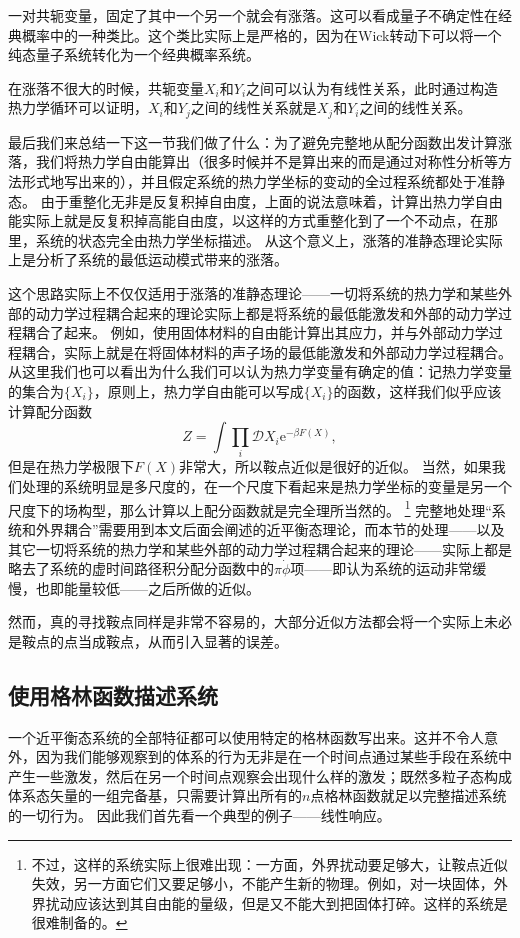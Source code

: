 \documentclass[hyperref, UTF8, a4paper]{ctexart}
\newcommand*{\ee}{\mathrm{e}}
\newcommand*{\fd}[1]{\mathcal{D}{#1}}
\begin{document}
一对共轭变量，固定了其中一个另一个就会有涨落。这可以看成量子不确定性在经典概率中的一种类比。这个类比实际上是严格的，因为在Wick转动下可以将一个纯态量子系统转化为一个经典概率系统。

在涨落不很大的时候，共轭变量$X_i$和$Y_i$之间可以认为有线性关系，此时通过构造热力学循环可以证明，$X_i$和$Y_j$之间的线性关系就是$X_j$和$Y_i$之间的线性关系。

最后我们来总结一下这一节我们做了什么：为了避免完整地从配分函数出发计算涨落，我们将热力学自由能算出（很多时候并不是算出来的而是通过对称性分析等方法形式地写出来的），并且假定系统的热力学坐标的变动的全过程系统都处于准静态。
由于重整化无非是反复积掉自由度，上面的说法意味着，计算出热力学自由能实际上就是反复积掉高能自由度，以这样的方式重整化到了一个不动点，在那里，系统的状态完全由热力学坐标描述。
从这个意义上，涨落的准静态理论实际上是分析了系统的最低运动模式带来的涨落。

这个思路实际上不仅仅适用于涨落的准静态理论——一切将系统的热力学和某些外部的动力学过程耦合起来的理论实际上都是将系统的最低能激发和外部的动力学过程耦合了起来。
例如，使用固体材料的自由能计算出其应力，并与外部动力学过程耦合，实际上就是在将固体材料的声子场的最低能激发和外部动力学过程耦合。
从这里我们也可以看出为什么我们可以认为热力学变量有确定的值：记热力学变量的集合为$\{X_i\}$，原则上，热力学自由能可以写成$\{X_i\}$的函数，这样我们似乎应该计算配分函数
\[
    Z = \int \prod_i \fd{X_i} \ee^{-\beta F(X)},
\]
但是在热力学极限下$F(X)$非常大，所以鞍点近似是很好的近似。
当然，如果我们处理的系统明显是多尺度的，在一个尺度下看起来是热力学坐标的变量是另一个尺度下的场构型，那么计算以上配分函数就是完全理所当然的。%
\footnote{不过，这样的系统实际上很难出现：一方面，外界扰动要足够大，让鞍点近似失效，另一方面它们又要足够小，不能产生新的物理。例如，对一块固体，外界扰动应该达到其自由能的量级，但是又不能大到把固体打碎。这样的系统是很难制备的。}%
完整地处理“系统和外界耦合”需要用到本文后面会阐述的近平衡态理论，而本节的处理——以及其它一切将系统的热力学和某些外部的动力学过程耦合起来的理论——实际上都是略去了系统的虚时间路径积分配分函数中的$\pi \dot{\phi}$项——即认为系统的运动非常缓慢，也即能量较低——之后所做的近似。

然而，真的寻找鞍点同样是非常不容易的，大部分近似方法都会将一个实际上未必是鞍点的点当成鞍点，从而引入显著的误差。

\subsection{使用格林函数描述系统}

一个近平衡态系统的全部特征都可以使用特定的格林函数写出来。这并不令人意外，因为我们能够观察到的体系的行为无非是在一个时间点通过某些手段在系统中产生一些激发，然后在另一个时间点观察会出现什么样的激发；既然多粒子态构成体系态矢量的一组完备基，只需要计算出所有的$n$点格林函数就足以完整描述系统的一切行为。
因此我们首先看一个典型的例子——线性响应。
\end{document}
